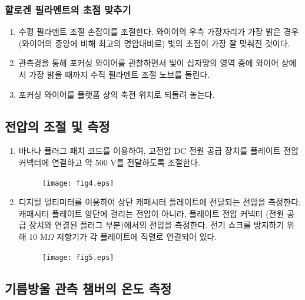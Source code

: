 \documentclass[a4paper, 10pt, nanum]{CSUniSchoolLabReport}
\begin{document}
\subsubsection{할로겐 필라멘트의 초점 맞추기}

\begin{enumerate}[label=\arabic*.]
	\item 수평 필라멘트 조절 손잡이를 조절한다. 와이어의 우측 가장자리가 가장 밝은 경우 (와이어의 중앙에 비해 최고의 명암대비로) 빛의 초점이 가장 잘 맞춰진 것이다.
	\item 관측경을 통해 포커싱 와이어를 관찰하면서 빛이 십자망의 영역 중에 와이어 상에서 가장 밝을 때까지 수직 필라멘트 조절 노브를 돌린다.
	\item 포커싱 와이어를 플랫폼 상의 축전 위치로 되돌려 놓는다.
\end{enumerate}	

\subsection{전압의 조절 및 측정}

\begin{enumerate}[label=\arabic*.]
	\item 바나나 플러그 패치 코드를 이용하여, 고전압 DC 전원 공급 장치를 플레이트 전압 커넥터에 연결하고 약 500 V를 전달하도록 조절한다.
	
	\begin{figure}[htb!]
		\centering
		\texttt{[image: fig4.eps]}
		\caption{}
		\label{fig:4}
	\end{figure}

	\item 디지털 멀티미터를 이용하여 상단 캐패시터 플레이트에 전달되는 전압을 측정한다. 캐패시터 플레이트 양단에 걸리는 전압이 아니라, 플레이트 전압 커넥터 (전원 공급 장치와 연결된 플러그 부분)에서의 전압을 측정한다. 전기 쇼크를 방지하기 위해 10 M$\Omega$ 저항기가 각 플레이트에 직렬로 연결되어 있다.
	
	\begin{figure}[htb!]
		\centering
		\texttt{[image: fig5.eps]}
		\caption{}
		\label{fig:5}
	\end{figure}

\end{enumerate}

\subsection{기름방울 관측 챔버의 온도 측정}
\end{document}

